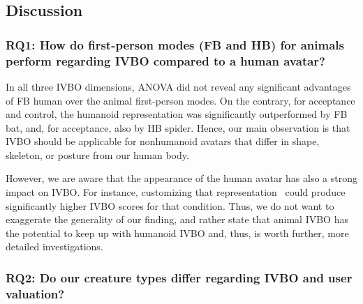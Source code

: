 \subsection{Discussion}




\subsubsection{\textbf{RQ1:} How do first-person modes (FB and HB) for animals perform regarding IVBO compared to a human avatar?}
In all three IVBO dimensions, ANOVA did not reveal any significant advantages of FB human over the animal first-person modes. On the contrary, for acceptance and control, the humanoid representation was significantly outperformed by FB bat, and, for acceptance, also by HB spider. Hence, our main observation is that IVBO should be applicable for nonhumanoid avatars that differ in shape, skeleton, or posture from our human body. 

However, we are aware that the appearance of the human avatar has also a strong impact on IVBO. For instance, customizing that representation~\cite{waltemate2018impact} could produce significantly higher IVBO scores for that condition. Thus, we do not want to exaggerate the generality of our finding, and rather state that animal IVBO has the potential to keep up with humanoid IVBO and, thus, is worth further, more detailed investigations.


\subsubsection{\textbf{RQ2:} Do our creature types differ regarding IVBO and user valuation?}

